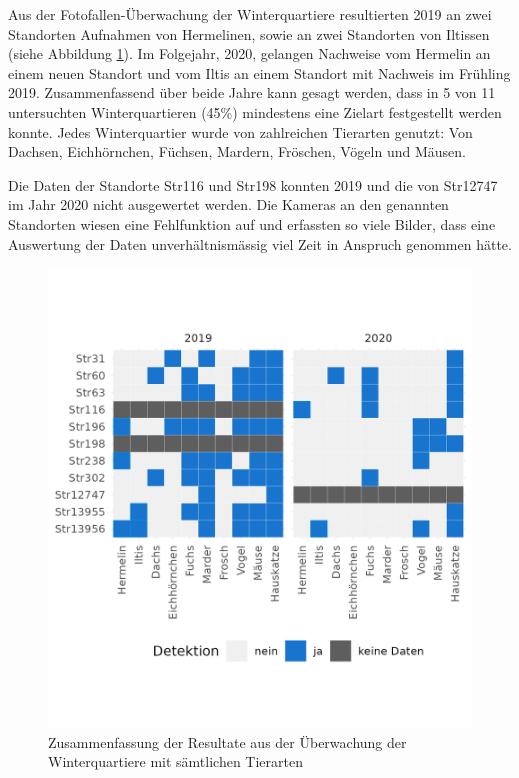 \documentclass[
  oneside]{scrbook}
\begin{document}
Aus der Fotofallen-Überwachung der Winterquartiere resultierten 2019 an zwei Standorten Aufnahmen von Hermelinen, sowie an zwei Standorten von Iltissen (siehe Abbildung \ref{fig:winterquartiereresultate}). Im Folgejahr, 2020, gelangen Nachweise vom Hermelin an einem neuen Standort und vom Iltis an einem Standort mit Nachweis im Frühling 2019. Zusammenfassend über beide Jahre kann gesagt werden, dass in 5 von 11 untersuchten Winterquartieren (45\%) mindestens eine Zielart festgestellt werden konnte. Jedes Winterquartier wurde von zahlreichen Tierarten genutzt: Von Dachsen, Eichhörnchen, Füchsen, Mardern, Fröschen, Vögeln und Mäusen.

Die Daten der Standorte Str116 und Str198 konnten 2019 und die von Str12747 im Jahr 2020 nicht ausgewertet werden. Die Kameras an den genannten Standorten wiesen eine Fehlfunktion auf und erfassten so viele Bilder, dass eine Auswertung der Daten unverhältnismässig viel Zeit in Anspruch genommen hätte.



\begin{figure}
\includegraphics[width=1\linewidth]{images/winterquartiere_resultate} \caption{Zusammenfassung der Resultate aus der Überwachung der Winterquartiere mit sämtlichen Tierarten}\label{fig:winterquartiereresultate}
\end{figure}
\end{document}
